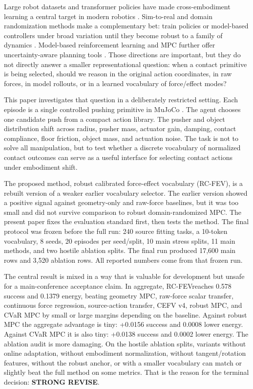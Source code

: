 \documentclass{article}
\newcommand{\method}{RC-FEV}
\begin{document}
Large robot datasets and transformer policies have made cross-embodiment learning a central target in modern robotics \citep{brohan2023rt1,brohan2023rt2,openx2023}. Sim-to-real and domain randomization methods make a complementary bet: train policies or model-based controllers under broad variation until they become robust to a family of dynamics \citep{tobin2017domain,peng2018sim,chebotar2019closing}. Model-based reinforcement learning and MPC further offer uncertainty-aware planning tools \citep{nagabandi2018neural,chua2018pets}. Those directions are important, but they do not directly answer a smaller representational question: when a contact primitive is being selected, should we reason in the original action coordinates, in raw forces, in model rollouts, or in a learned vocabulary of force/effect modes?

This paper investigates that question in a deliberately restricted setting. Each episode is a single controlled pushing primitive in MuJoCo \citep{todorov2012mujoco}. The agent chooses one candidate push from a compact action library. The pusher and object distribution shift across radius, pusher mass, actuator gain, damping, contact compliance, floor friction, object mass, and actuation noise. The task is not to solve all manipulation, but to test whether a discrete vocabulary of normalized contact outcomes can serve as a useful interface for selecting contact actions under embodiment shift.

The proposed method, robust calibrated force-effect vocabulary (\method), is a rebuilt version of a weaker earlier vocabulary selector. The earlier version showed a positive signal against geometry-only and raw-force baselines, but it was too small and did not survive comparison to robust domain-randomized MPC. The present paper fixes the evaluation standard first, then tests the method. The final protocol was frozen before the full run: 240 source fitting tasks, a 10-token vocabulary, 8 seeds, 20 episodes per seed/split, 10 main stress splits, 11 main methods, and two hostile ablation splits. The final run produced 17,600 main rows and 3,520 ablation rows. All reported numbers come from that frozen run.

The central result is mixed in a way that is valuable for development but unsafe for a main-conference acceptance claim. In aggregate, \method reaches 0.578 success and 0.1379 energy, beating geometry MPC, raw-force scalar transfer, continuous force regression, source-action transfer, CEFV v4, robust MPC, and CVaR MPC by small or large margins depending on the baseline. Against robust MPC the aggregate advantage is tiny: +0.0156 success and 0.0008 lower energy. Against CVaR MPC it is also tiny: +0.0138 success and 0.0002 lower energy. The ablation audit is more damaging. On the hostile ablation splits, variants without online adaptation, without embodiment normalization, without tangent/rotation features, without the robust anchor, or with a smaller vocabulary can match or slightly beat the full method on some metrics. That is the reason for the terminal decision: \textbf{STRONG REVISE}.
\end{document}
